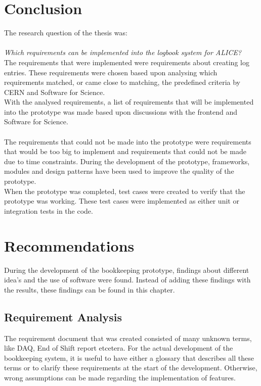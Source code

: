 \documentclass[paper=a4, fontsize=11pt,twoside]{scrartcl}	%
\begin{document}
\newpage
\section{Conclusion}
The research question of the thesis was: \\ \\
\textit{Which requirements can be implemented into the logbook system for ALICE?} \\

The requirements that were implemented were requirements about creating log entries. These requirements were chosen based upon analysing which requirements matched, or came close to matching, the predefined criteria by CERN and Software for Science. \\
With the analysed requirements, a list of requirements that will be implemented into the prototype was made based upon discussions with the frontend and Software for Science. \\ \\ 
The requirements that could not be made into the prototype were requirements that would be too big to implement and requirements that could not be made due to time constraints. During the development of the prototype, frameworks, modules and design patterns have been used to improve the quality of the prototype. \\
When the prototype was completed, test cases were created to verify that the prototype was working. These test cases were implemented as either unit or integration tests in the code. 

\newpage
\section{Recommendations}
During the development of the bookkeeping prototype, findings about different idea's and the use of software were found. Instead of adding these findings with the results, these findings can be found in this chapter. \\ 
\subsection{Requirement Analysis}
The requirement document that was created consisted of many unknown terms, like DAQ, End of Shift report etcetera. For the actual development of the bookkeeping system, it is useful to have either a glossary that describes all these terms or to clarify these requirements at the start of the development. Otherwise, wrong assumptions can be made regarding the implementation of features. \\
\end{document}
